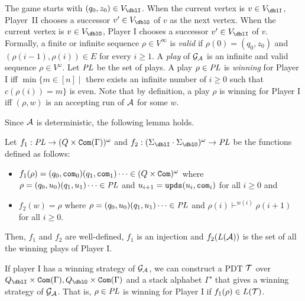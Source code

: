 The game starts with $(q_0,z_0)\in V_\dblI$.
When the current vertex is $v\in V_\dblI$,
Player~II chooses a successor $v'\in V_\dblO$ of $v$ as the next vertex.
When the current vertex is $v\in V_\dblO$,
Player I chooses a successor $v'\in V_\dblI$ of $v$.
Formally, a finite or infinite sequence $\rho\in V^\infty$ is
\emph{valid} if
$\rho(0)=(q_0,z_0)$ and
$(\rho(i-1), \rho(i))\in E$ for every $i\geq 1$.
A \emph{play} of ${\cal G}_{\cal A}$ is an infinite and valid sequence $\rho\in V^\omega$.
Let $\mathit{PL}$ be the set of plays.
A play $\rho\in \mathit{PL}$ is \emph{winning} for Player I iff
$\min\{m\in[n] \mid $ there exists an infinite
number of $i\geq 0$ such that $c(\rho(i)) = m\}$ is even.
Note that by definition, a play $\rho$ is winning for Player I iff $(\rho,w)$ is an accepting run of ${\cal A}$ for some $w$.

Since ${\cal A}$ is deterministic,
the following lemma holds.
\begin{lemma}
\label{lem: cor}
Let $f_1: \mathit{PL}\to(Q\times\mathtt{Com}(\Gamma))^\omega$ and
$f_2: (\Sigma_\dblI\cdot\Sigma_\dblO)^\omega \to \PL$ be the functions defined as follows:
\begin{itemize}
\item $f_1(\rho)=(q_0,\mathtt{com}_0)(q_1,\mathtt{com}_1)\cdots\in (Q\times\mathtt{Com})^\omega$ where
$\rho = (q_0,u_0)(q_1,u_1)\cdots\in \mathit{PL}$ and
$u_{i+1} = \mathtt{upds}(u_{i},\mathtt{com}_i)$
for all $i\geq 0$ and
\item $f_2(w)=\rho$ where $\rho=(q_0,u_0)(q_1,u_1)\cdots\in \mathit{PL}$ and
$\rho(i)\vdash^{w(i)} \rho(i+1)$ for all $i\geq 0$.
\end{itemize}
Then, $f_1$ and $f_2$ are well-defined,
$f_1$ is an injection and $f_2(L({\cal A}))$ is the set of all the winning plays of Player I.
\end{lemma}
\begin{theorem}{\cite{Wa96}}
\label{the: wal}
If player I has a winning strategy of ${\cal G}_{\cal A}$,
we can construct a PDT ${\cal T}$ over $Q_\dblI\times\Com(\Gamma), Q_\dblO\times\Com(\Gamma)$ and a stack alphabet $\Gamma'$ that gives a winning strategy of ${\cal G}_{\cal A}$.
That is, $\rho\in \mathit{PL}$ is winning for Player I if $f_1(\rho)\in L({\cal T})$.
\end{theorem}

